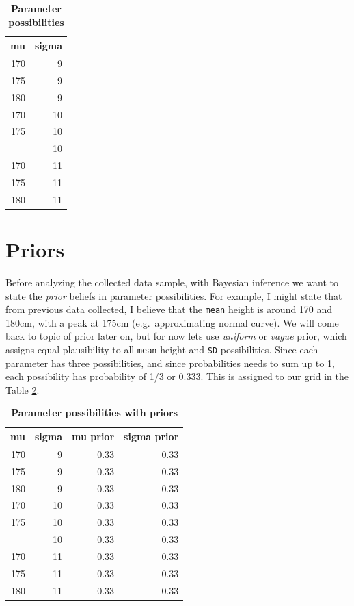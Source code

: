 \documentclass[
]{book}
\begin{document}
\begin{table}

\caption{\label{tab:bayes-height-grid}\textbf{Parameter possibilities}}
\centering
\begin{tabular}[t]{rr}
\toprule
mu & sigma\\
\midrule
170 & 9\\
175 & 9\\
180 & 9\\
170 & 10\\
175 & 10\\
\addlinespace
180 & 10\\
170 & 11\\
175 & 11\\
180 & 11\\
\bottomrule
\end{tabular}
\end{table}

\hypertarget{priors}{%
\section{Priors}\label{priors}}

Before analyzing the collected data sample, with Bayesian inference we want to state the \emph{prior} beliefs in parameter possibilities. For example, I might state that from previous data collected, I believe that the \texttt{mean} height is around 170 and 180cm, with a peak at 175cm (e.g.~approximating normal curve). We will come back to topic of prior later on, but for now lets use \emph{uniform} or \emph{vague} prior, which assigns equal plausibility to all \texttt{mean} height and \texttt{SD} possibilities. Since each parameter has three possibilities, and since probabilities needs to sum up to 1, each possibility has probability of 1/3 or 0.333. This is assigned to our grid in the Table \ref{tab:bayes-height-grid-priors}.



\begin{table}

\caption{\label{tab:bayes-height-grid-priors}\textbf{Parameter possibilities with priors}}
\centering
\begin{tabular}[t]{rrrr}
\toprule
mu & sigma & mu prior & sigma prior\\
\midrule
170 & 9 & 0.33 & 0.33\\
175 & 9 & 0.33 & 0.33\\
180 & 9 & 0.33 & 0.33\\
170 & 10 & 0.33 & 0.33\\
175 & 10 & 0.33 & 0.33\\
\addlinespace
180 & 10 & 0.33 & 0.33\\
170 & 11 & 0.33 & 0.33\\
175 & 11 & 0.33 & 0.33\\
180 & 11 & 0.33 & 0.33\\
\bottomrule
\end{tabular}
\end{table}
\end{document}
